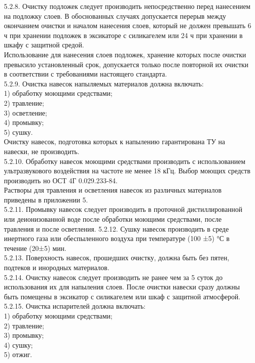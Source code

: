 \documentclass{bmstu}
\begin{document}
	5.2.8. Очистку подложек следует производить непосредственно перед нанесением на подложку слоев. В обоснованных случаях допускается перерыв между окончанием очистки и началом нанесения слоев, который не должен превышать 6 ч при хранении подложек в эксикаторе с силикагелем или 24 ч при хранении в шкафу с  защитной  средой. \\
	Использование для нанесения слоев подложек, хранение которых после очистки превысило установленный срок, допускается только после повторной их очистки в соответствии с требованиями настоящего стандарта. \\
	5.2.9. Очистка навесок напыляемых материалов должна включать: \\
	1) обработку моющими средствами; \\
	2) травление; \\
	3) осветление; \\
	4) промывку; \\
	5) сушку. \\
	Очистку навесок, подготовка которых к напылению гарантирована ТУ на навески, не производить. \\
	5.2.10. Обработку навесок моющими средствами производить с использованием ультразвукового воздействия на частоте не менее 18 кГц. Выбор моющих средств производить но ОСТ 4Г 0.029.233-84. \\
	Растворы для травления и осветления навесок из различных материалов приведены в приложении 5. \\
	5.2.11. Промывку навесок следует производить в проточной дистиллированной или деионизованной воде после обработки моющими средствами, после травления и после осветления.
	5.2.12. Сушку навесок производить в среде инертного газа или обеспыленного воздуха при температуре (100 ±5) °С в течение (20±5) мин. \\
	5.2.13. Поверхность навесок, прошедших очистку, должна быть без пятен, подтеков и инородных материалов. \\
	5.2.14. Очистку навесок следует производить не ранее чем за 5 суток до использования их для напыления слоев. После очистки навески сразу должны быть помещены в эксикатор с силикагелем или шкаф с защитной атмосферой. 5.2.15. Очистка испарителей должна включать: \\
	1) обработку моющими средствами; \\
	2) травление; \\
	3) промывку; \\
	4) сушку; \\
	5) отжиг. \\
\end{document}
